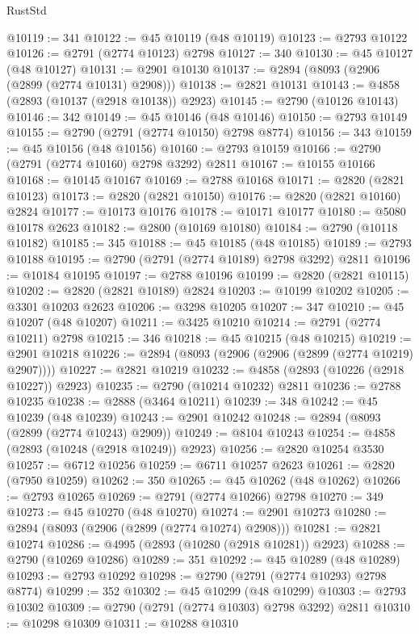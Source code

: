 \begin{lexlean}{RustStd}
\begin{coremodule}
@10119 := 341
@10122 := @45 @10119 (@48 @10119)
@10123 := @2793 @10122
@10126 := @2791 (@2774 @10123) @2798
@10127 := 340
@10130 := @45 @10127 (@48 @10127)
@10131 := @2901 @10130
@10137 := @2894 (@8093 (@2906 (@2899 (@2774 @10131) @2908)))
@10138 := @2821 @10131
@10143 := @4858 (@2893 (@10137 (@2918 @10138)) @2923)
@10145 := @2790 (@10126 @10143)
@10146 := 342
@10149 := @45 @10146 (@48 @10146)
@10150 := @2793 @10149
@10155 := @2790 (@2791 (@2774 @10150) @2798 @8774)
@10156 := 343
@10159 := @45 @10156 (@48 @10156)
@10160 := @2793 @10159
@10166 := @2790 (@2791 (@2774 @10160) @2798 @3292) @2811
@10167 := @10155 @10166
@10168 := @10145 @10167
@10169 := @2788 @10168
@10171 := @2820 (@2821 @10123)
@10173 := @2820 (@2821 @10150)
@10176 := @2820 (@2821 @10160) @2824
@10177 := @10173 @10176
@10178 := @10171 @10177
@10180 := @5080 @10178 @2623
@10182 := @2800 (@10169 @10180)
@10184 := @2790 (@10118 @10182)
@10185 := 345
@10188 := @45 @10185 (@48 @10185)
@10189 := @2793 @10188
@10195 := @2790 (@2791 (@2774 @10189) @2798 @3292) @2811
@10196 := @10184 @10195
@10197 := @2788 @10196
@10199 := @2820 (@2821 @10115)
@10202 := @2820 (@2821 @10189) @2824
@10203 := @10199 @10202
@10205 := @3301 @10203 @2623
@10206 := @3298 @10205
@10207 := 347
@10210 := @45 @10207 (@48 @10207)
@10211 := @3425 @10210
@10214 := @2791 (@2774 @10211) @2798
@10215 := 346
@10218 := @45 @10215 (@48 @10215)
@10219 := @2901 @10218
@10226 := @2894 (@8093 (@2906 (@2906 (@2899 (@2774 @10219) @2907))))
@10227 := @2821 @10219
@10232 := @4858 (@2893 (@10226 (@2918 @10227)) @2923)
@10235 := @2790 (@10214 @10232) @2811
@10236 := @2788 @10235
@10238 := @2888 (@3464 @10211)
@10239 := 348
@10242 := @45 @10239 (@48 @10239)
@10243 := @2901 @10242
@10248 := @2894 (@8093 (@2899 (@2774 @10243) @2909))
@10249 := @8104 @10243
@10254 := @4858 (@2893 (@10248 (@2918 @10249)) @2923)
@10256 := @2820 @10254 @3530
@10257 := @6712 @10256
@10259 := @6711 @10257 @2623
@10261 := @2820 (@7950 @10259)
@10262 := 350
@10265 := @45 @10262 (@48 @10262)
@10266 := @2793 @10265
@10269 := @2791 (@2774 @10266) @2798
@10270 := 349
@10273 := @45 @10270 (@48 @10270)
@10274 := @2901 @10273
@10280 := @2894 (@8093 (@2906 (@2899 (@2774 @10274) @2908)))
@10281 := @2821 @10274
@10286 := @4995 (@2893 (@10280 (@2918 @10281)) @2923)
@10288 := @2790 (@10269 @10286)
@10289 := 351
@10292 := @45 @10289 (@48 @10289)
@10293 := @2793 @10292
@10298 := @2790 (@2791 (@2774 @10293) @2798 @8774)
@10299 := 352
@10302 := @45 @10299 (@48 @10299)
@10303 := @2793 @10302
@10309 := @2790 (@2791 (@2774 @10303) @2798 @3292) @2811
@10310 := @10298 @10309
@10311 := @10288 @10310

\end{coremodule}
\end{lexlean}
